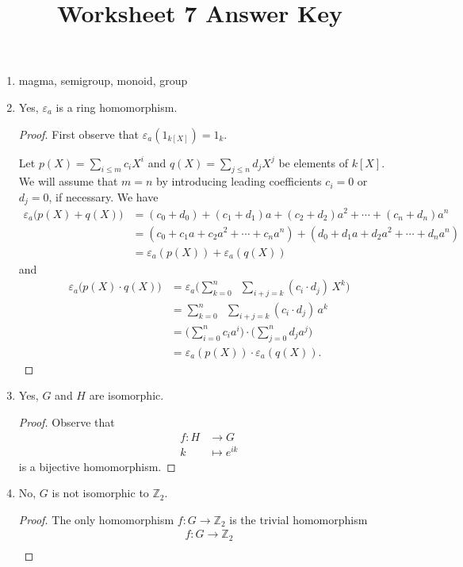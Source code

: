\documentclass{article}
\title{Worksheet 7 Answer Key}
\author{}\date{}
\newcommand{\Z}{\mathbb{Z}}
\renewcommand{\epsilon}{\varepsilon}
\begin{document}
\maketitle

\begin{enumerate}
	\item magma, semigroup, monoid, group
	\item Yes, $\epsilon_a$ is a ring homomorphism.
		\begin{proof}
			First observe that $\epsilon_a(1_{k[X]})=1_k$.

			Let $p(X)=\sum_{i\leq m} c_iX^i$ and $q(X)=\sum_{j\leq n}d_jX^j$ be elements of $k[X]$. We will assume that $m=n$ by introducing leading coefficients $c_i=0$ or $d_j=0$, if necessary. We have
			\begin{align*}
				\epsilon_a\big(p(X)+q(X)\big)				
					&=	(c_0+d_0) + (c_1+d_1)a + (c_2+d_2)a^2 + \cdots + (c_n+d_n)a^n				\\
					&=	(c_0 + c_1a + c_2a^2 + \cdots + c_na^n) + (d_0 + d_1a + d_2a^2 + \cdots + d_na^n)	\\
					&=	\epsilon_a(p(X)) + \epsilon_a(q(X))
			\end{align*}
			and
			\begin{align*}
				\epsilon_a\big(p(X)\cdot q(X)\big)
					&=	\epsilon_a\Big( \sum_{k=0}^n \;\; \sum_{i+j=k} (c_i\cdot d_j)\, X^k \Big)		\\
					&=	\sum_{k=0}^n \;\; \sum_{i+j=k} (c_i\cdot d_j)\, a^k					\\
					&=	\Big(\sum_{i=0}^n c_ia^i\Big) \cdot \Big(\sum_{j=0}^n d_ja^j\Big)			\\
					&=	\epsilon_a(p(X)) \cdot \epsilon_a(q(X)).
			\end{align*}
		\end{proof}
	\item Yes, $G$ and $H$ are isomorphic.
		\begin{proof}
			Observe that
			\begin{align*}
				f :	H	&\to		G	\\
					k	&\mapsto	e^{ik}
			\end{align*}
			is a bijective homomorphism.
		\end{proof}
	\item No, $G$ is not isomorphic to $\Z_2$.
		\begin{proof}
			The only homomorphism $f:G\to\Z_2$ is the trivial homomorphism
			\begin{align*}
				f:	G	\to	\Z_2	\\

\end{align*}
\end{proof}
\end{enumerate}
\end{document}
